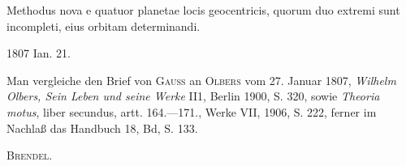 \noindent\hspace*{\parindent}Methodus nova e quatuor planetae locis geocentricis, quorum duo extremi sunt incompleti, eius orbitam determinandi.
\par\noindent\hfill 1807 Ian. 21.
\par\medskip\begingroup\small
\noindent\hspace*{\parindent}Man vergleiche den Brief von \textsc{Gauss} an \textsc{Olbers} vom 27. Januar 1807, \textit{Wilhelm Olbers, Sein Leben und seine Werke} II1, Berlin 1900, S. 320, sowie \textit{Theoria motus}, liber secundus, artt. 164.—171., Werke VII, 1906, S. 222, ferner im Nachlaß das Handbuch 18, Bd, S. 133.
\par\noindent\hfill\textsc{Brendel.}
\par\endgroup
